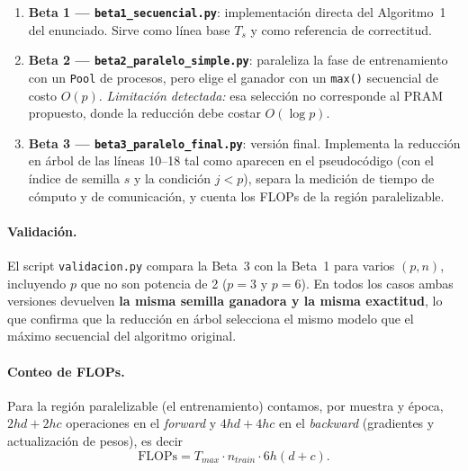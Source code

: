 \documentclass[11pt,a4paper]{article}
\begin{document}
\begin{enumerate}[leftmargin=1.2cm]
\item \textbf{Beta 1 --- \texttt{beta1\_secuencial.py}}: implementación directa del Algoritmo~1 del enunciado. Sirve como línea base $T_s$ y como referencia de correctitud.
\item \textbf{Beta 2 --- \texttt{beta2\_paralelo\_simple.py}}: paraleliza la fase de entrenamiento con un \texttt{Pool} de procesos, pero elige el ganador con un \texttt{max()} secuencial de costo $O(p)$. \emph{Limitación detectada:} esa selección no corresponde al PRAM propuesto, donde la reducción debe costar $O(\log p)$.
\item \textbf{Beta 3 --- \texttt{beta3\_paralelo\_final.py}}: versión final. Implementa la reducción en árbol de las líneas 10--18 tal como aparecen en el pseudocódigo (con el índice de semilla $s$ y la condición $j<p$), separa la medición de tiempo de cómputo y de comunicación, y cuenta los FLOPs de la región paralelizable.
\end{enumerate}

\paragraph{Validación.} El script \texttt{validacion.py} compara la Beta~3 con la Beta~1 para varios $(p,n)$, incluyendo $p$ que no son potencia de 2 ($p=3$ y $p=6$). En todos los casos ambas versiones devuelven \textbf{la misma semilla ganadora y la misma exactitud}, lo que confirma que la reducción en árbol selecciona el mismo modelo que el máximo secuencial del algoritmo original.

\paragraph{Conteo de FLOPs.} Para la región paralelizable (el entrenamiento) contamos, por muestra y época, $2hd + 2hc$ operaciones en el \emph{forward} y $4hd+4hc$ en el \emph{backward} (gradientes y actualización de pesos), es decir
\[ \text{FLOPs} = T_{max}\cdot n_{train}\cdot 6h(d+c). \]
\end{document}
